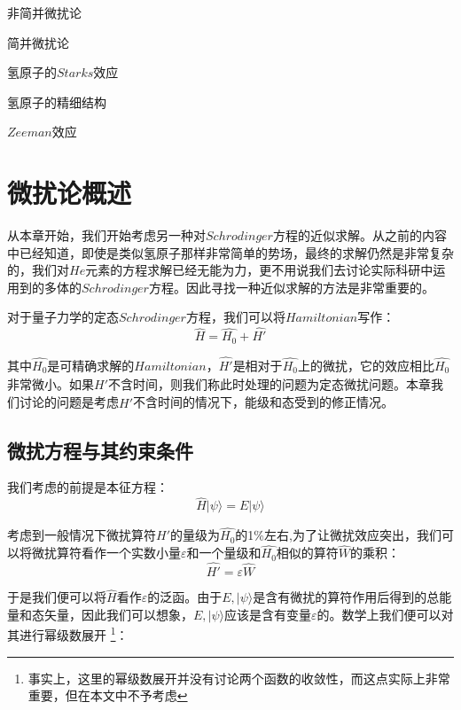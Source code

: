 \begin{introduction}
    \item 非简并微扰论
    \item 简并微扰论
    \item 氢原子的$Starks$效应
    \item 氢原子的精细结构
    \item $Zeeman$效应
\end{introduction}
\section{微扰论概述}
从本章开始，我们开始考虑另一种对$Schrodinger$方程的近似求解。从之前的内容中已经知道，即使是类似氢原子那样非常简单的势场，最终的求解仍然是非常复杂的，我们对$He$元素的方程求解已经无能为力，更不用说我们去讨论实际科研中运用到的多体的$Schrodinger$方程。因此寻找一种近似求解的方法是非常重要的。

对于量子力学的定态$Schrodinger$方程，我们可以将$Hamiltonian$写作：
\begin{equation}
    \hat{H}=\hat{H_0}+\hat{H'}
\end{equation}

其中$\hat{H_0}$是可精确求解的$Hamiltonian$，$\hat{H'}$是相对于$\hat{H_0}$上的微扰，它的效应相比$\hat{H_0}$非常微小。如果$\hat{H'}$不含时间，则我们称此时处理的问题为定态微扰问题。本章我们讨论的问题是考虑$\hat{H'}$不含时间的情况下，能级和态受到的修正情况。
    \subsection{微扰方程与其约束条件}
    我们考虑的前提是本征方程：
    \begin{equation}\label{equ7:weirao}
        \hat{H}|\psi \rangle =E |\psi \rangle
    \end{equation}
    
    考虑到一般情况下微扰算符$\hat{H'}$的量级为$\hat{H_0}$的1\%左右,为了让微扰效应突出，我们可以将微扰算符看作一个实数小量$\varepsilon$和一个量级和$\hat{H_0}$相似的算符$\hat{W}$的乘积：
    \begin{equation} \label{equ7:suanfu}
        \hat{H'}=\varepsilon \hat{W}
    \end{equation}
    
    于是我们便可以将$\hat{H}$看作$\varepsilon$的泛函。由于$E,|\psi \rangle$是含有微扰的算符作用后得到的总能量和态矢量，因此我们可以想象，$E,|\psi \rangle$应该是含有变量$\varepsilon$的。数学上我们便可以对其进行幂级数展开
    \footnote{事实上，这里的幂级数展开并没有讨论两个函数的收敛性，而这点实际上非常重要，但在本文中不予考虑}：
    
